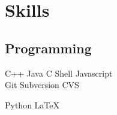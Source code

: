 \documentclass[a4paper]{awesome-deedy}
\begin{document}
\begin{minipage}[t]{0.33\textwidth}




\section{Skills}
\subsection{Programming}
\begin{center}
C++ \textbullet{} Java \textbullet{} C \textbullet{} Shell \textbullet{} Javascript \\
Git \textbullet{} Subversion \textbullet{} CVS \\
\end{center}
\begin{center}
Python \textbullet{} \LaTeX \\
\end{center}
\sectionsep


\end{minipage}
\end{document}
